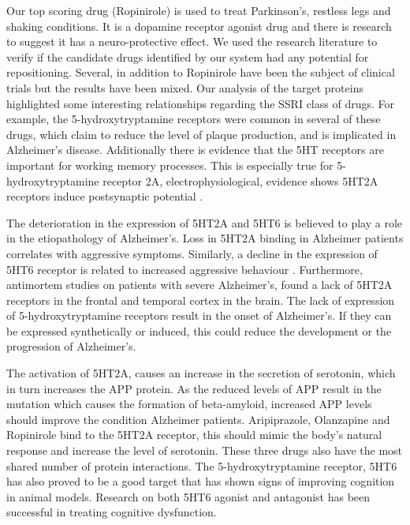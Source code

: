 \documentclass[preprint,12pt]{elsarticle}
\begin{document}
Our top scoring drug (Ropinirole) is used to treat Parkinson's, restless legs and shaking conditions. It is a dopamine receptor agonist drug and there is research to suggest it has a neuro-protective effect. We used the research literature to  verify if the candidate drugs identified by our system had any potential for repositioning. Several, in addition to Ropinirole have been the subject of clinical trials but the results have been mixed. Our analysis of the target proteins highlighted some interesting relationships regarding the SSRI class of drugs. For example, the 5-hydroxytryptamine receptors were common in several of these drugs, which claim to reduce the level of plaque production, and is implicated in Alzheimer's disease. Additionally there is evidence that the 5HT receptors are important for working memory processes. This is especially true for 5-hydroxytryptamine receptor 2A, electrophysiological, evidence shows 5HT2A receptors induce postsynaptic potential \cite{Ramirez2013}.  

The deterioration in the expression of 5HT2A and 5HT6 is believed to play a role in the etiopathology of Alzheimer's. Loss in 5HT2A binding in Alzheimer patients correlates with aggressive symptoms. Similarly, a decline in the expression of 5HT6 receptor is related to increased aggressive behaviour \cite{Lorke2006}. Furthermore, antimortem studies on patients with severe Alzheimer's, found a lack of 5HT2A receptors in the frontal and temporal cortex in the brain. The lack of expression of 5-hydroxytryptamine receptors result in the onset of Alzheimer's. If they can be expressed synthetically or induced, this could reduce the development or the progression of Alzheimer's.  

The activation of 5HT2A, causes an increase in the secretion of serotonin, which in turn increases the APP protein. As the reduced levels of APP result in the mutation which causes the formation of beta-amyloid, increased APP levels should improve the condition Alzheimer patients. Aripiprazole, Olanzapine and Ropinirole bind to the 5HT2A receptor, this should mimic the body’s natural response and increase the level of serotonin. These three drugs also have the most shared number of protein interactions. The 5-hydroxytryptamine receptor, 5HT6 has also proved to be a good target that has shown signs of improving cognition in animal models. Research on both 5HT6 agonist and antagonist has been successful in treating cognitive dysfunction.
  
\end{document}
